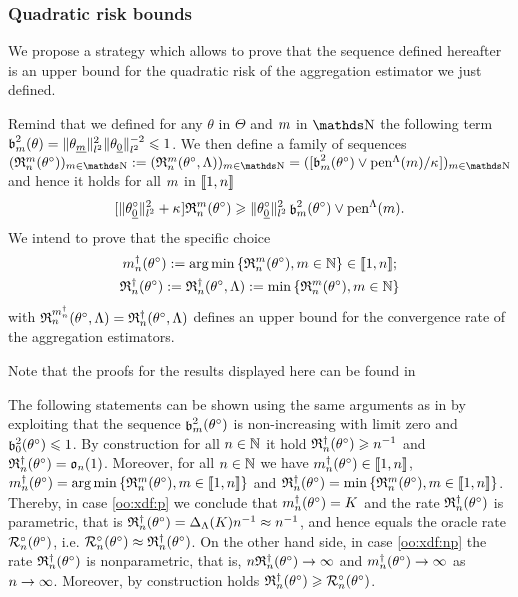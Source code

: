\subsubsection{Quadratic risk bounds}\label{freq:ge:strat:kn:qu}
We propose a strategy which allows to prove that the sequence defined hereafter is an upper bound for the quadratic risk of the aggregation estimator we just defined.
\begin{de}\label{freq:ge:strat:kn:qu:de:rate}
Remind that we defined for any $\theta$ in $\Theta$ and $\Di$ in $\N$ the following term $\b_{m}^{2}(\theta) = \Vert \theta_{\underline{m}} \Vert_{l^{2}}^{2}\Vert \theta_{\underline{0}} \Vert_{l^{2}}^{-2} \leq 1$.
We then define a family of sequences $(\daRa{\Di}{(\xdf)})_{\Di \in \N} := (\daRa{\Di}{(\xdf,\Lambda)})_{\Di \in \N} = ([\b_{m}^{2}(\theta^{\circ}) \vee \penSv/\cpen])_{\Di \in \N}$ and hence it holds for all $\Di$ in $\nset{1,\ssY}$
    \begin{equation}\label{freq:ge:strat:kn:qu:de:rate:e1}
      [\Vnormlp{\xdf_{\underline{0}}}^2+\cpen]\daRa{\Di}{(\xdf)}\geq\Vnormlp{\xdf_{\underline{0}}}^2\bias^2(\xdf)\vee\penSv.
      \end{equation}
We intend to prove that the specific choice
\begin{multline*}
\aDi{\ssY}(\xdf):=\argmin\Nset[\Di\in\Nz]{\daRa{\Di}{(\xdf)}}\in\nset{1,\ssY}; \\
\naRa{(\xdf)}:=\naRa{(\xdf,\Lambda)}:=\min\Nset[\Di\in\Nz]{\daRa{\Di}{(\xdf)}}
\end{multline*}
with $\daRa{\aDi{\ssY}}{(\xdf,\Lambda)}=\naRa{(\xdf,\Lambda)}$ defines an upper bound for the convergence rate of the aggregation estimators.
\assEnd
\end{de}
Note that the proofs for the results displayed here can be found in 
\begin{rmk}\label{freq:ge:strat:kn:qu:rmk:rate} The following statements can be
shown using the same   arguments as in 
by exploiting that the sequence $\bias^2(\xdf)$ is non-increasing with limit zero and $\bias[0]^2(\xdf)\leq1$. 
By construction  for all $\ssY\in\Nz$ it hold 
$\naRa{(\xdf)}\geq \ssY^{-1}$ and $\naRa{(\xdf)}=\mathfrak{o}_{n}(1)$.
Moreover, for all $\ssY\in\Nz$ we have $\aDi{\ssY}(\xdf)\in\nset{1,\ssY}$,
$\aDi{\ssY}(\xdf)=\argmin\Nset[{\Di\in\nset{1,\ssY}}]{\daRa{\Di}{(\xdf)}}$ and 
$\naRa{(\xdf)}=\min\Nset[{\Di\in\nset{1,\ssY}}]{\daRa{\Di}{(\xdf)}}$. 
Thereby, in case \ref{oo:xdf:p} we conclude that $\aDi{\ssY}(\xdf)=K$ and
the rate $\naRa{(\xdf)}$ is parametric, that is
$\naRa{(\xdf)}=\DipenSv[K]\ssY^{-1}\approx\ssY^{-1}$, and hence
equals the oracle rate $\oRa{\xdf}$, i.e. $\oRa{\xdf}\approx\naRa{(\xdf)}$. On the other
hand side, in case \ref{oo:xdf:np}  the rate
$\naRa{(\xdf)}$ is nonparametric, that is,
$\ssY\naRa{(\xdf)}\to\infty$ and $\aDi{\ssY}(\xdf)\to\infty$  as
$\ssY\to\infty$. Moreover, by construction holds $\naRa{(\xdf)}\geq\oRa{\xdf}$.
 \remEnd
\end{rmk}

